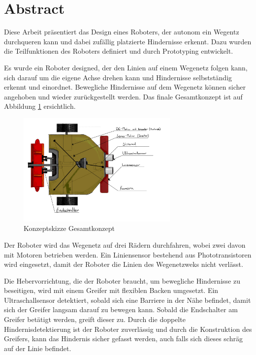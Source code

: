 \section*{Abstract}

Diese Arbeit präsentiert das Design eines Roboters, der autonom ein Wegentz durchqueren kann und dabei zufällig platzierte Hindernisse erkennt. Dazu wurden die Teilfunktionen des Roboters definiert und durch Prototyping entwickelt.

Es wurde ein Roboter designed, der den Linien auf einem Wegenetz folgen kann, sich darauf um die eigene Achse drehen kann und Hindernisse selbstständig erkennt und einordnet. Bewegliche Hindernisse auf dem Wegenetz können sicher angehoben und wieder zurückgestellt werden.  Das finale Gesamtkonzept ist auf Abbildung \ref{fig:robot_concept-scetch_labeld-abstract} ersichtlich.

\begin{figure}[H]
\centering
\includegraphics[width=0.7\textwidth]{assets/gesamtkonzept/Skizze-Fahrzeugkonzept-Beschriftet.jpg}
\caption{Konzeptskizze Gesamtkonzept}
\label{fig:robot_concept-scetch_labeld-abstract}
\end{figure}

Der Roboter wird das Wegenetz auf drei Rädern durchfahren, wobei zwei davon mit Motoren betrieben werden. Ein Liniensensor bestehend aus Phototransistoren wird eingesetzt, damit der Roboter die Linien des Wegenetzweks nicht verlässt.

Die Hebervorrichtung, die der Roboter braucht, um bewegliche Hindernisse zu beseitigen, wird mit einem Greifer mit flexiblen Backen umgesetzt. Ein Ultraschallsensor detektiert, sobald sich eine Barriere in der Nähe befindet, damit sich der Greifer langsam darauf zu bewegen kann. Sobald die Endschalter am Greifer betätigt werden, greift dieser zu. Durch die doppelte Hindernisdetektierung ist der Roboter zuverlässig und durch die Konstruktion des Greifers, kann das Hindernis sicher gefasst werden, auch falls sich dieses schräg auf der Linie befindet.

